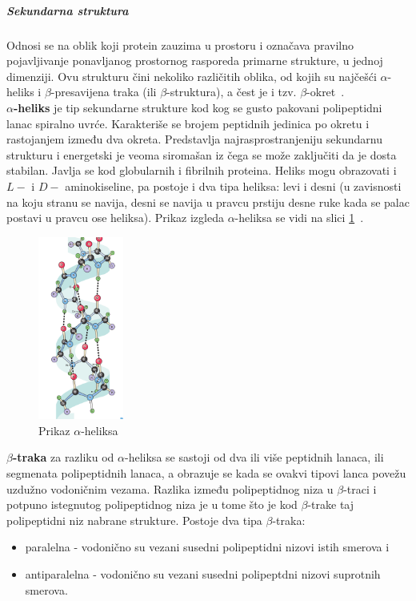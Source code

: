 \subparagraph{Sekundarna struktura}
Odnosi se na oblik koji protein zauzima u prostoru i označava pravilno pojavljivanje ponavljanog prostornog rasporeda primarne strukture, u jednoj dimenziji. Ovu strukturu čini nekoliko različitih oblika, od kojih su najčešći $\alpha$-heliks i $\beta$-presavijena traka (ili $\beta$-struktura), a čest je i tzv. $\beta$-okret~\cite{spasic,medbio}.\\
\textbf{$\alpha$-heliks} je tip sekundarne strukture kod kog se gusto pakovani polipeptidni lanac spiralno uvrće. Karakteriše se brojem peptidnih jedinica po okretu i rastojanjem između dva okreta. Predstavlja najrasprostranjeniju sekundarnu strukturu i energetski je veoma siromašan iz čega se može zaključiti da je dosta stabilan. Javlja se kod globularnih i fibrilnih proteina. Heliks mogu obrazovati i $L-$ i $D-$ aminokiseline, pa postoje i dva tipa heliksa: levi i desni (u zavisnosti na koju stranu se navija, desni se navija u pravcu prstiju desne ruke kada se palac postavi u pravcu ose heliksa). Prikaz izgleda $\alpha$-heliksa se vidi na slici \ref{fig:aheliks}~\cite{spasic, Principi}.
\begin{figure}[H]
	\centering
    \includegraphics[width=0.25\textwidth]{Figures/BO/ahelix.png}
    \caption{Prikaz $\alpha$-heliksa~\cite{bmbg}}
    \label{fig:aheliks}
\end{figure}
\textbf{$\beta$-traka} za razliku od $\alpha$-heliksa se sastoji od dva ili više peptidnih lanaca, ili segmenata polipeptidnih lanaca, a obrazuje se kada se ovakvi tipovi lanca povežu uzdužno vodoničnim vezama. Razlika između polipeptidnog niza u  $\beta$-traci i potpuno istegnutog polipeptidnog niza je u tome što je kod  $\beta$-trake taj polipeptidni niz nabrane strukture. Postoje dva tipa $\beta$-traka: 
\begin{itemize}
\item paralelna - vodonično su vezani susedni polipeptidni nizovi istih smerova  i 
\item antiparalelna - vodonično su vezani susedni polipeptdni nizovi suprotnih smerova. 
\end{itemize}
